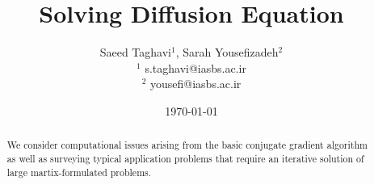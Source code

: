 \documentclass{article}
\title{Solving Diffusion Equation}
\author{Saeed Taghavi$^{1}$, Sarah Yousefizadeh$^{2}$ \\
$^{1}$ s.taghavi@iasbs.ac.ir\\
$^{2}$ yousefi@iasbs.ac.ir
}
\date{\today}
\begin{document}
\maketitle
\begin{abstract}
We consider computational issues arising from the basic conjugate gradient algorithm as well as surveying 
typical application problems that require an iterative solution of large martix-formulated problems. 
 
 \end{abstract}


\flushbottom %

\maketitle %
\tableofcontents %

\thispagestyle{empty} %










 
%

  



 
\end{document}
